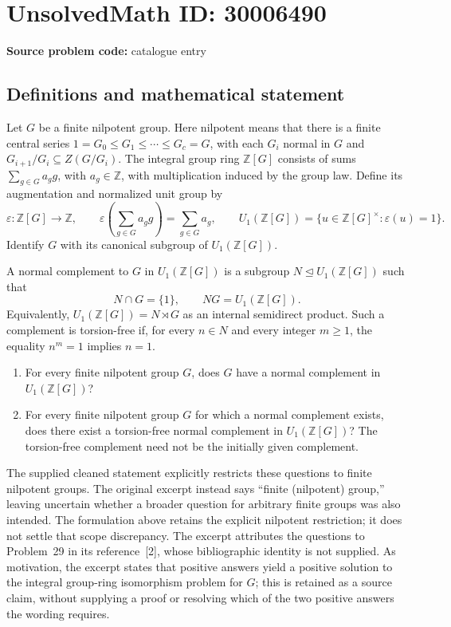 \documentclass[11pt]{article}
\newcommand{\Z}{\mathbb{Z}}
\begin{document}
\section*{UnsolvedMath ID: 30006490}
\textbf{Source problem code:} catalogue entry
\subsection{Definitions and mathematical statement}
Let \(G\) be a finite nilpotent group. Here nilpotent means that there is a finite central series \(1=G_0\leq G_1\leq\cdots\leq G_c=G\), with each \(G_i\) normal in \(G\) and \(G_{i+1}/G_i\subseteq Z(G/G_i)\). The integral group ring \(\Z[G]\) consists of sums \(\sum_{g\in G}a_g g\), with \(a_g\in\Z\), with multiplication induced by the group law. Define its augmentation and normalized unit group by
\[
\varepsilon:\Z[G]\longrightarrow\Z,\qquad \varepsilon\!\left(\sum_{g\in G}a_g g\right)=\sum_{g\in G}a_g,
\qquad
U_1(\Z[G])=\{u\in\Z[G]^\times:\varepsilon(u)=1\}.
\]
Identify \(G\) with its canonical subgroup of \(U_1(\Z[G])\).

A normal complement to \(G\) in \(U_1(\Z[G])\) is a subgroup \(N\trianglelefteq U_1(\Z[G])\) such that
\[
N\cap G=\{1\},\qquad NG=U_1(\Z[G]).
\]
Equivalently, \(U_1(\Z[G])=N\rtimes G\) as an internal semidirect product. Such a complement is torsion-free if, for every \(n\in N\) and every integer \(m\geq1\), the equality \(n^m=1\) implies \(n=1\).

\begin{enumerate}
\item For every finite nilpotent group \(G\), does \(G\) have a normal complement in \(U_1(\Z[G])\)?
\item For every finite nilpotent group \(G\) for which a normal complement exists, does there exist a torsion-free normal complement in \(U_1(\Z[G])\)? The torsion-free complement need not be the initially given complement.
\end{enumerate}

The supplied cleaned statement explicitly restricts these questions to finite nilpotent groups. The original excerpt instead says ``finite (nilpotent) group,'' leaving uncertain whether a broader question for arbitrary finite groups was also intended. The formulation above retains the explicit nilpotent restriction; it does not settle that scope discrepancy. The excerpt attributes the questions to Problem~29 in its reference~[2], whose bibliographic identity is not supplied. As motivation, the excerpt states that positive answers yield a positive solution to the integral group-ring isomorphism problem for \(G\); this is retained as a source claim, without supplying a proof or resolving which of the two positive answers the wording requires.
\end{document}
